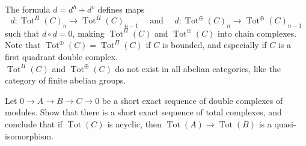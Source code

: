 The formula $d=d^h+d^v$ defines maps
$$
d: \operatorname{Tot}^{\Pi}(C)_n \rightarrow \operatorname{Tot}^{\Pi}(C)_{n-1} \quad \text { and } \quad d: \operatorname{Tot}^{\oplus}(C)_n \rightarrow \operatorname{Tot}^{\oplus}(C)_{n-1}
$$
such that $d \circ d=0$, making $\operatorname{Tot}^{\Pi}(C)$ and $\operatorname{Tot}^{\oplus}(C)$ into chain complexes. Note that $\operatorname{Tot}^{\oplus}(C)=\operatorname{Tot}^{\Pi}(C)$ if $C$ is bounded, and especially if $C$ is a first quadrant double complex.\\ $\operatorname{Tot}^{\Pi}(C)$ and $\operatorname{Tot}^{\oplus}(C)$ do not exist in all abelian categories, like the category of finite abelian groups.

\begin{prop}
Let $0 \rightarrow A \rightarrow B \rightarrow C \rightarrow 0$ be a short exact sequence of double complexes of modules. Show that there is a short exact sequence of total complexes, and conclude that if $\operatorname{Tot}(C)$ is acyclic, then $\operatorname{Tot}(A) \rightarrow \operatorname{Tot}(B)$ is a quasi-isomorphism.
\end{prop}
